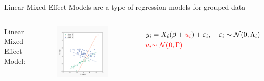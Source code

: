 \documentclass[8pt]{beamer}
\begin{document}
\begin{frame}{Linear Mixed-Effect Models are a type of regression models for grouped data}
\begin{columns}[T,onlytextwidth]
   	
    	\centering  Linear Mixed-Effect Model:
   	\begin{figure}
   		\includegraphics[width=0.9\textwidth]{Figures/lme_example_random_prediction}
   	\end{figure}
   	   		\[
   		\begin{split}
   			y_i & = X_i(\beta + {\color{red} u_i}) + \varepsilon_i, \quad \varepsilon_i \sim \operatorname{\mathcal{N}}(0, \Lambda_i) \\
   			{\color{red} u_i} & {\color{red}\sim \operatorname{\mathcal{N}}(0, \Gamma)}
   		\end{split}
   		\]

   	
  \end{columns}
\end{frame}
\end{document}
